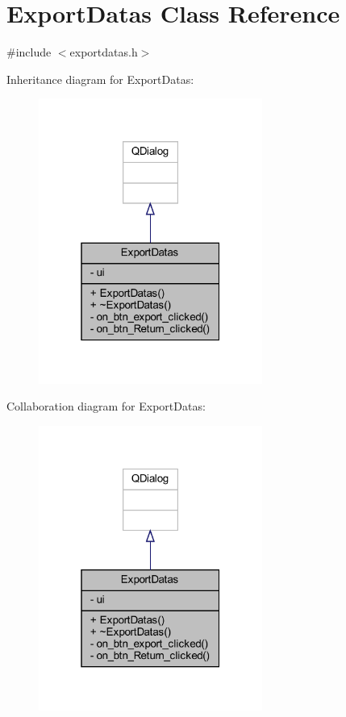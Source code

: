 \hypertarget{class_export_datas}{}\section{Export\+Datas Class Reference}
\label{class_export_datas}


{\ttfamily \#include $<$exportdatas.\+h$>$}



Inheritance diagram for Export\+Datas\+:
\nopagebreak
\begin{figure}[H]
\begin{center}
\leavevmode
\includegraphics[width=208pt]{class_export_datas__inherit__graph}
\end{center}
\end{figure}


Collaboration diagram for Export\+Datas\+:
\nopagebreak
\begin{figure}[H]
\begin{center}
\leavevmode
\includegraphics[width=208pt]{class_export_datas__coll__graph}
\end{center}
\end{figure}

